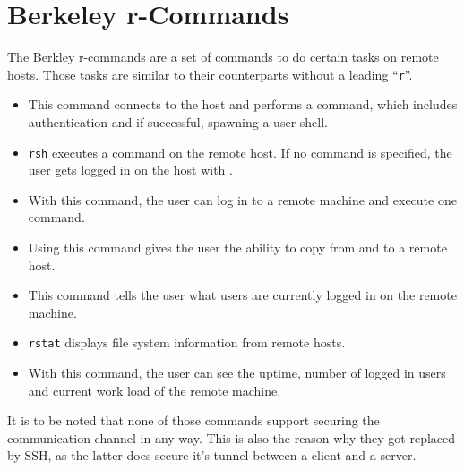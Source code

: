 \documentclass[10pt,a4paper,titlepage,twoside,english,final]{zhawreprt}
\begin{document}
\section{Berkeley r-Commands}\label{sec:BerkeleyRCommands}
The Berkley r-commands are a set of commands to do certain tasks on remote hosts.
Those tasks are similar to their counterparts without a leading ``\texttt{r}''.

\begin{itemize}
\item \cite{rlogin}

This command connects to the host and performs a \cite{login} command, which includes authentication and if successful, spawning a user \gls{shell}.

\item \cite{rsh}

\texttt{rsh} executes a command on the remote host. If no command is specified, the user gets logged in on the host with \cite{rlogin}.

\item \cite{rexec}

With this command, the user can log in to a remote machine and execute one command.

\item \cite{rcp}

Using this command gives the user the ability to copy from and to a remote host.

\item \cite{rwho}

This command tells the user what users are currently logged in on the remote machine.

\item \cite{rstat}

\texttt{rstat} displays file system information from remote hosts.

\item \cite{ruptime}

With this command, the user can see the \gls{uptime}, number of logged in users and current work load of the remote machine.
\end{itemize}

It is to be noted that none of those commands support securing the communication channel in any way.
This is also the reason why they got replaced by \gls{SSH}, as the latter does secure it's tunnel between a client and a server.
\end{document}
